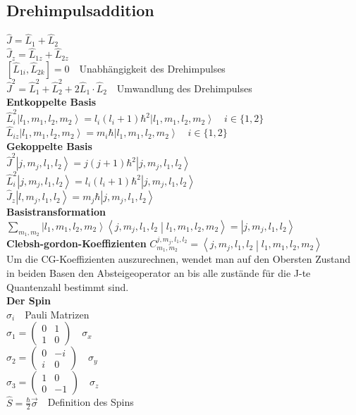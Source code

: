 \documentclass[8pt,a4paper]{extarticle}
\newcommand{\frml}[2]{$#1$~\hfill~#2\\}
\newcommand{\komut}[2]{\left[#1,#2 \right]}
\newcommand{\ket}[1]{\left|#1\right\rangle}
\newcommand{\oper}[1]{\hat#1}
\newcommand{\braket}[2]                               %
{\left\langle#1 \middle| #2\right\rangle}
\begin{document}
\begin{multicols}{3}
\subsection{Drehimpulsaddition}
\frml{\oper{J}=\oper{L}_1+\oper{L}_2}{}
\frml{\oper{J}_z = \oper{L}_{1z} +\oper{L}_{2z}}{}
\frml{\komut{\oper{L}_{1i}}{\oper{L}_{2k}} = 0}{Unabh\"angigkeit des Drehimpulses}
\frml{\oper{J}^2 = \oper{L}_1^2 + \oper{L}_2^2+2\oper{L}_1\cdot \oper{L}_2}{Umwandlung des Drehimpulses}
\textbf{Entkoppelte Basis}\\
\frml{\oper{L}_i^2\ket{l_1,m_1,l_2,m_2} = l_i(l_i+1)\hbar^2\ket{l_1,m_1,l_2,m_2}}{$i\in\{1,2\}$}
\frml{\oper{L}_{iz}\ket{l_1,m_1,l_2,m_2} = m_i\hbar\ket{l_1,m_1,l_2,m_2}}{$i\in\{1,2\}$}
\textbf{Gekoppelte Basis}\\
\frml{\oper{J}^2\ket{j,m_j,l_1,l_2} = j(j+1)\hbar^2\ket{j,m_j,l_1,l_2}}{}
\frml{\oper{L}_i^2\ket{j,m_j,l_1,l_2} = l_i(l_i+1)\hbar^2\ket{j,m_j,l_1,l_2}}{}
\frml{\oper{J}_z\ket{l,m_j,l_1,l_2} = m_j\hbar\ket{j,m_j,l_1,l_2}}{}
\textbf{Basistransformation}\\
\frml{\sum_{m_1,m_2}\ket{l_1,m_1,l_2,m_2}\braket{j,m_j,l_1,l_2}{l_1,m_1,l_2,m_2} = \ket{j,m_j,l_1,l_2}}{}
\textbf{Clebsh-gordon-Koeffizienten}
\frml{C_{m_1,m_2}^{j,m_j,l_1,l_2} = \braket{j,m_j,l_1,l_2}{l_1,m_1,l_2,m_2}}{}
Um die CG-Koeffizienten auszurechnen, wendet man auf den Obersten Zustand in beiden Basen den Absteigeoperator an
bis alle zust\"ande f\"ur die J-te Quantenzahl bestimmt sind.\\
\textbf{Der Spin}\\
\frml{\sigma_i}{Pauli Matrizen}
\frml{\sigma_1 = \begin{pmatrix} 0 & 1 \\ 1 & 0 \end{pmatrix}}{$\sigma_x$}
\frml{\sigma_2 = \begin{pmatrix} 0 & -i \\ i & 0 \end{pmatrix}}{$\sigma_y$}
\frml{\sigma_3 = \begin{pmatrix} 1 & 0 \\ 0 & -1 \end{pmatrix}}{$\sigma_z$}
\frml{\oper{S} = \frac{\hbar}{2}\vec{\sigma}}{Definition des Spins}

\end{multicols}
\end{document}
